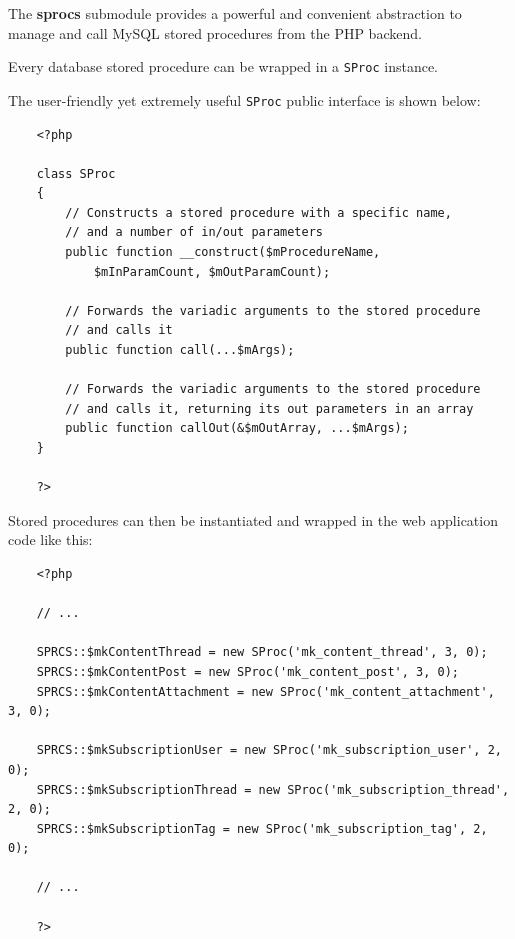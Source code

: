 \documentclass[12pt]{report}
\renewcommand\emph{\textbf}
\begin{document}
                    The \emph{sprocs} submodule provides a powerful and convenient abstraction to manage and call MySQL stored procedures from the PHP backend.

                    Every database stored procedure can be wrapped in a \texttt{SProc} instance.

                    The user-friendly yet extremely useful \texttt{SProc} public interface is shown below:

                    \begin{verbatim}
    <?php

    class SProc
    {
        // Constructs a stored procedure with a specific name,
        // and a number of in/out parameters
        public function __construct($mProcedureName, 
            $mInParamCount, $mOutParamCount);

        // Forwards the variadic arguments to the stored procedure
        // and calls it
        public function call(...$mArgs);

        // Forwards the variadic arguments to the stored procedure
        // and calls it, returning its out parameters in an array
        public function callOut(&$mOutArray, ...$mArgs);
    }

    ?>
                    \end{verbatim}      

                    Stored procedures can then be instantiated and wrapped in the web application code like this:

                    \begin{verbatim}          
    <?php

    // ...

    SPRCS::$mkContentThread = new SProc('mk_content_thread', 3, 0);
    SPRCS::$mkContentPost = new SProc('mk_content_post', 3, 0);
    SPRCS::$mkContentAttachment = new SProc('mk_content_attachment', 3, 0);

    SPRCS::$mkSubscriptionUser = new SProc('mk_subscription_user', 2, 0);
    SPRCS::$mkSubscriptionThread = new SProc('mk_subscription_thread', 2, 0);
    SPRCS::$mkSubscriptionTag = new SProc('mk_subscription_tag', 2, 0);

    // ...

    ?>
                    \end{verbatim}      
\end{document}
